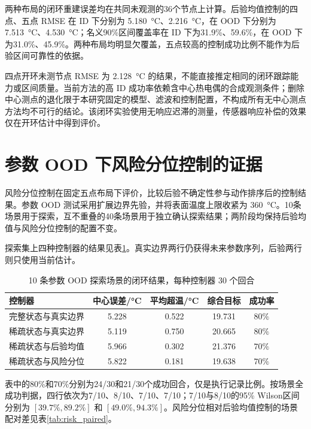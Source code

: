 两种布局的闭环重建误差均在共同未观测的36个节点上计算。后验均值控制的四点、五点 RMSE 在 ID 下分别为 \SI{5.180}{\degreeCelsius}、\SI{2.216}{\degreeCelsius}，在 OOD 下分别为 \SI{7.513}{\degreeCelsius}、\SI{4.530}{\degreeCelsius}；名义90\%区间覆盖率在 ID 下为31.9\%、59.6\%，在 OOD 下为31.0\%、45.9\%。两种布局均明显欠覆盖，五点较高的控制成功比例不能作为后验区间可靠性的依据。

四点开环未测节点 RMSE 为 \SI{2.128}{\degreeCelsius} 的结果，不能直接推定相同的闭环跟踪能力或区间质量。当前方法的高 ID 成功率依赖含中心热电偶的合成观测条件；删除中心测点的退化限于本研究固定的模型、滤波和控制配置，不构成所有无中心测点方法均不可行的结论。该闭环实验使用无响应迟滞的测量，传感器响应补偿的效果仅在开环估计中得到评价。

\section{参数 OOD 下风险分位控制的证据}

风险分位控制在固定五点布局下评价，比较后验不确定性参与动作排序后的控制结果。参数 OOD 测试采用扩展边界先验，并将表面温度上限收紧为 \SI{360}{\degreeCelsius}。10条场景用于探索，互不重叠的40条场景用于独立确认探索结果；两阶段均保持后验均值与风险分位控制的配置不变。

探索集上四种控制器的结果见表\ref{tab:ood_control}。真实边界两行仍获得未来参数序列，后验两行则只使用当前估计。

\begin{table}[H]
  \centering
  \caption{10 条参数 OOD 探索场景的闭环结果，每种控制器 30 个回合}
  \label{tab:ood_control}
  \begin{tabular}{lcccc}
    \toprule
    控制器 & 中心误差/\si{\degreeCelsius} & 平均超温/\si{\degreeCelsius} & 综合目标 & 成功率 \\
    \midrule
    完整状态与真实边界 & 5.228 & 0.522 & 19.731 & $80\%$ \\
    稀疏状态与真实边界 & 5.119 & 0.750 & 20.665 & $80\%$ \\
    稀疏状态与后验均值 & 5.966 & 0.302 & 21.376 & $70\%$ \\
    稀疏状态与风险分位 & 5.822 & 0.181 & 19.638 & $70\%$ \\
    \bottomrule
  \end{tabular}
\end{table}

表中的80\%和70\%分别为24/30和21/30个成功回合，仅是执行记录比例。按场景全成功判据，四行依次为7/10、8/10、7/10、7/10；7/10与8/10的95\% Wilson区间分别为 $[39.7\%,89.2\%]$ 和 $[49.0\%,94.3\%]$。风险分位相对后验均值控制的场景配对差见表\ref{tab:risk_paired}。

